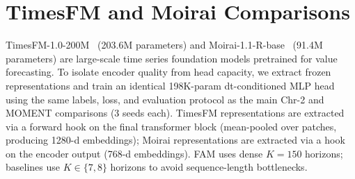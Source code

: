 \documentclass{article}
\begin{document}
\section{TimesFM and Moirai Comparisons}
\label{app:extra_baselines}

TimesFM-1.0-200M~\citep{das2024timesfm} (203.6M parameters) and Moirai-1.1-R-base~\citep{woo2024unified} (91.4M parameters) are large-scale time series foundation models pretrained for value forecasting. To isolate encoder quality from head capacity, we extract frozen representations and train an identical 198K-param dt-conditioned MLP head using the same labels, loss, and evaluation protocol as the main Chr-2 and MOMENT comparisons (3 seeds each). TimesFM representations are extracted via a forward hook on the final transformer block (mean-pooled over patches, producing 1280-d embeddings); Moirai representations are extracted via a hook on the encoder output (768-d embeddings). FAM uses dense $K{=}150$ horizons; baselines use $K{\in}\{7,8\}$ horizons to avoid sequence-length bottlenecks.
\end{document}
